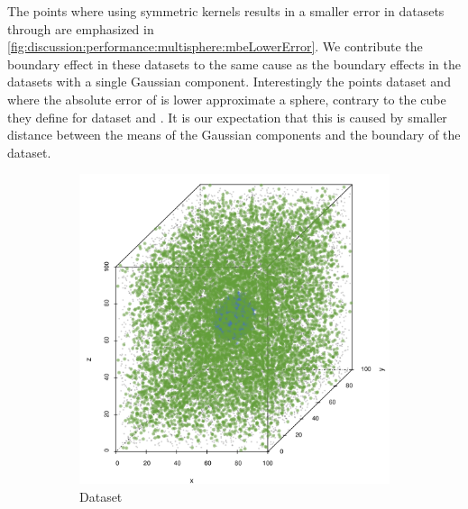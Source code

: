 	The points where using symmetric kernels results in a smaller error in datasets \ferdosiTwo through \baakmanThree are emphasized in
	\cref{fig:discussion:performance:multisphere:mbeLowerError}. We contribute the boundary effect in these datasets to the same cause as the boundary effects in the datasets with a single Gaussian component. Interestingly the points dataset \ferdosiThree and \baakmanThree where the absolute error of \mbe is lower approximate a sphere, contrary to the cube they define for dataset \ferdosiTwo and \baakmanTwo. It is our expectation that this is caused by smaller distance between the means of the Gaussian components and the boundary of the dataset. 

	\begin{figure}
		\centering
		\begin{subfigure}{0.23\textwidth}
			\centering
			\includegraphics[keepaspectratio=true, width=\textwidth, height=0.23\textheight]{discussion/img/ferdosi_1_abs_error_mbeSmallerThansambe}
			\caption{Dataset \ferdosiOne}
			\label{fig:discussion:performance:mbeLowerError:ferdosi1}
		\end{subfigure}
		\begin{subfigure}{0.23\textwidth}
			\centering

\end{subfigure}
\end{figure}
